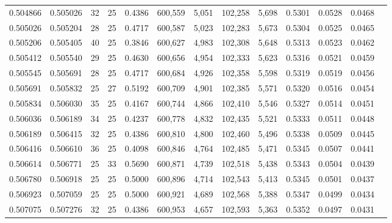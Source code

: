 \begin{tabular}{rrrrrrrrrrrrr}
0.504866 & 0.505026 &    32 &  25 &                                     0.4386 & 600,559 &   5,051 & 102,258 &   5,698 & 0.5301 & 0.0528 & 0.0468 \\
0.505026 & 0.505204 &    28 &  25 &                                     0.4717 & 600,587 &   5,023 & 102,283 &   5,673 & 0.5304 & 0.0525 & 0.0465 \\
0.505206 & 0.505405 &    40 &  25 &                                     0.3846 & 600,627 &   4,983 & 102,308 &   5,648 & 0.5313 & 0.0523 & 0.0462 \\
0.505412 & 0.505540 &    29 &  25 &                                     0.4630 & 600,656 &   4,954 & 102,333 &   5,623 & 0.5316 & 0.0521 & 0.0459 \\
0.505545 & 0.505691 &    28 &  25 &                                     0.4717 & 600,684 &   4,926 & 102,358 &   5,598 & 0.5319 & 0.0519 & 0.0456 \\
0.505691 & 0.505832 &    25 &  27 &                                     0.5192 & 600,709 &   4,901 & 102,385 &   5,571 & 0.5320 & 0.0516 & 0.0454 \\
0.505834 & 0.506030 &    35 &  25 &                                     0.4167 & 600,744 &   4,866 & 102,410 &   5,546 & 0.5327 & 0.0514 & 0.0451 \\
0.506036 & 0.506189 &    34 &  25 &                                     0.4237 & 600,778 &   4,832 & 102,435 &   5,521 & 0.5333 & 0.0511 & 0.0448 \\
0.506189 & 0.506415 &    32 &  25 &                                     0.4386 & 600,810 &   4,800 & 102,460 &   5,496 & 0.5338 & 0.0509 & 0.0445 \\
0.506416 & 0.506610 &    36 &  25 &                                     0.4098 & 600,846 &   4,764 & 102,485 &   5,471 & 0.5345 & 0.0507 & 0.0441 \\
0.506614 & 0.506771 &    25 &  33 &                                     0.5690 & 600,871 &   4,739 & 102,518 &   5,438 & 0.5343 & 0.0504 & 0.0439 \\
0.506780 & 0.506918 &    25 &  25 &                                     0.5000 & 600,896 &   4,714 & 102,543 &   5,413 & 0.5345 & 0.0501 & 0.0437 \\
0.506923 & 0.507059 &    25 &  25 &                                     0.5000 & 600,921 &   4,689 & 102,568 &   5,388 & 0.5347 & 0.0499 & 0.0434 \\
0.507075 & 0.507276 &    32 &  25 &                                     0.4386 & 600,953 &   4,657 & 102,593 &   5,363 & 0.5352 & 0.0497 & 0.0431 \\

\end{tabular}
